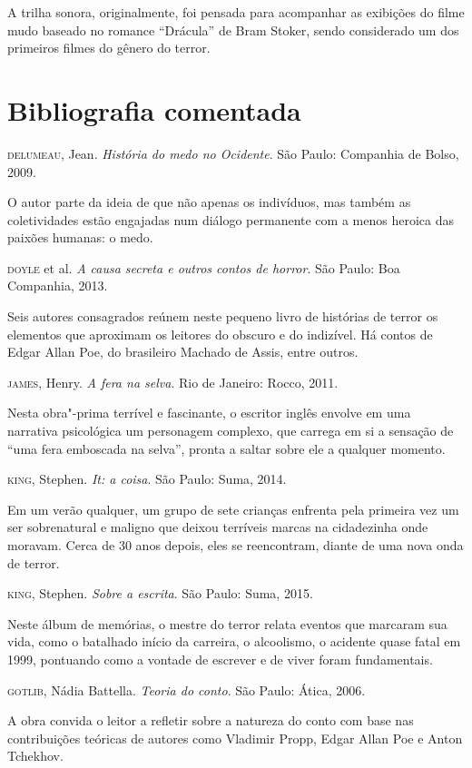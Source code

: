 \documentclass[12pt]{extarticle}
\begin{document}
A trilha sonora, originalmente, foi pensada para acompanhar as exibições do filme mudo baseado 
no romance ``Drácula'' de Bram Stoker, sendo considerado um dos primeiros filmes do gênero do 
terror.

\section{Bibliografia comentada}


\textsc{delumeau}, Jean. \textit{História do medo no Ocidente}. São Paulo:
Companhia de Bolso, 2009.

O autor parte da ideia de que não apenas os indivíduos, mas também as
coletividades estão engajadas num diálogo permanente com a menos heroica
das paixões humanas: o medo.

\textsc{doyle} et al. \textit{A causa secreta e outros contos de horror}. São
Paulo: Boa Companhia, 2013.

Seis autores consagrados reúnem neste pequeno livro de histórias de
terror os elementos que aproximam os leitores do obscuro e do indizível.
Há contos de Edgar Allan Poe, do brasileiro Machado de Assis, entre
outros.

\textsc{james}, Henry. \textit{A fera na selva}. Rio de Janeiro: Rocco, 2011.

Nesta obra"-prima terrível e fascinante, o escritor inglês envolve em uma
narrativa psicológica um personagem complexo, que carrega em si a
sensação de ``uma fera emboscada na selva'', pronta a saltar sobre ele a
qualquer momento.

\textsc{king}, Stephen. \textit{It: a coisa}. São Paulo: Suma, 2014.

Em um verão qualquer, um grupo de sete crianças enfrenta pela primeira
vez um ser sobrenatural e maligno que deixou terríveis marcas na
cidadezinha onde moravam. Cerca de 30 anos depois, eles se reencontram,
diante de uma nova onda de terror.

\textsc{king}, Stephen. \textit{Sobre a escrita}. São Paulo: Suma, 2015.

Neste álbum de memórias, o mestre do terror relata eventos que marcaram
sua vida, como o batalhado início da carreira, o alcoolismo, o acidente
quase fatal em 1999, pontuando como a vontade de escrever e de viver
foram fundamentais.

\textsc{gotlib}, Nádia Battella. \textit{Teoria do conto}. São Paulo: Ática, 2006.

A obra convida o leitor a refletir sobre a natureza do conto com base
nas contribuições teóricas de autores como Vladimir Propp, Edgar Allan
Poe e Anton Tchekhov.
\end{document}
